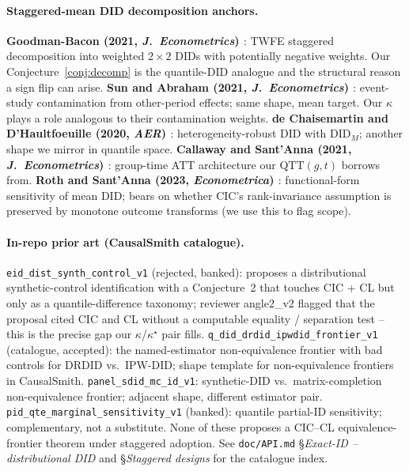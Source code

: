 \documentclass[11pt]{article}
\theoremstyle{definition}
\theoremstyle{plain}
\theoremstyle{remark}
\begin{document}
\paragraph{Staggered-mean DID decomposition anchors.}
\textbf{Goodman-Bacon (2021, \emph{J.\ Econometrics}) \cite{GoodmanBacon2021}}: TWFE staggered decomposition into weighted $2 \times 2$ DIDs with potentially negative weights. Our Conjecture~\ref{conj:decomp} is the quantile-DID analogue and the structural reason a sign flip can arise.
\textbf{Sun and Abraham (2021, \emph{J.\ Econometrics}) \cite{SunAbraham2021}}: event-study contamination from other-period effects; same shape, mean target. Our $\kappa$ plays a role analogous to their contamination weights.
\textbf{de Chaisemartin and D'Haultfoeuille (2020, \emph{AER}) \cite{deChaisemartinDHaultfoeuille2020}}: heterogeneity-robust DID with $\mathrm{DID}_M$; another shape we mirror in quantile space.
\textbf{Callaway and Sant'Anna (2021, \emph{J.\ Econometrics}) \cite{CallawaySantAnna2021}}: group-time ATT architecture our $\mathrm{QTT}(g,t)$ borrows from.
\textbf{Roth and Sant'Anna (2023, \emph{Econometrica}) \cite{RothSantAnna2023}}: functional-form sensitivity of mean DID; bears on whether CIC's rank-invariance assumption is preserved by monotone outcome transforms (we use this to flag scope).

\paragraph{In-repo prior art (CausalSmith catalogue).} \texttt{eid\_dist\_synth\_control\_v1} (rejected, banked): proposes a distributional synthetic-control identification with a Conjecture~2 that touches CIC + CL but only as a quantile-difference taxonomy; reviewer angle2\_v2 flagged that the proposal cited CIC and CL without a computable equality / separation test -- this is the precise gap our $\kappa$/$\kappa^\star$ pair fills. \texttt{q\_did\_drdid\_ipwdid\_frontier\_v1} (catalogue, accepted): the named-estimator non-equivalence frontier with bad controls for DRDID vs.\ IPW-DID; shape template for non-equivalence frontiers in CausalSmith. \texttt{panel\_sdid\_mc\_id\_v1}: synthetic-DID vs.\ matrix-completion non-equivalence frontier; adjacent shape, different estimator pair. \texttt{pid\_qte\_marginal\_sensitivity\_v1} (banked): quantile partial-ID sensitivity; complementary, not a substitute. None of these proposes a CIC--CL equivalence-frontier theorem under staggered adoption. See \texttt{doc/API.md} \S\emph{Exact-ID -- distributional DID} and \S\emph{Staggered designs} for the catalogue index.
\end{document}
